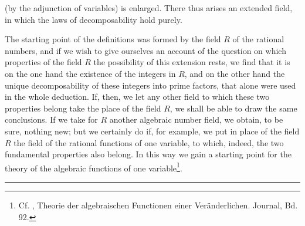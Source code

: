 (by the adjunction of variables) is enlarged. There thus arises an extended field, in which the laws of decomposability hold purely.

The starting point of the definitions was formed by the field $R$ of the rational numbers, and if we wish to give ourselves an account of the question on which properties of the field $R$ the possibility of this extension rests, we find that it is on the one hand the existence of the integers in $R$, and on the other hand the unique decomposability of these integers into prime factors, that alone were used in the whole deduction. If, then, we let any other field to which these two properties belong take the place of the field $R$, we shall be able to draw the same conclusions. If we take for $R$ another algebraic number field, we obtain, to be sure, nothing new; but we certainly do if, for example, we put in place of the field $R$ the field of the rational functions of one variable, to which, indeed, the two fundamental properties also belong. In this way we gain a starting point for the theory of the algebraic functions of one variable\footnote{Cf. , Theorie der algebraischen Functionen einer Veränderlichen.  Journal, Bd. 92.}.

\begin{center}
\rule{4cm}{0.4pt}
\end{center}

